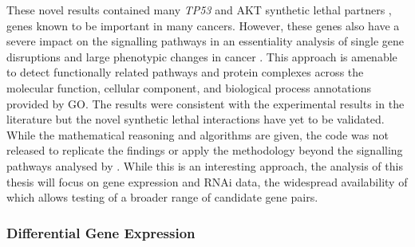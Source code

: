 These novel results contained many \textit{TP53} and AKT \gls{synthetic lethal} partners \citep{Zhang2015}, genes known to be important in many cancers. However, these genes also have a severe impact on the signalling \glspl{pathway} in an essentiality analysis of single gene disruptions and large phenotypic changes in cancer \citep{Zhang2015}. This approach is amenable to detect functionally related \glspl{pathway} and protein complexes across the molecular function, cellular component, and biological process annotations provided by \acrlong{GO}. The results were consistent with the experimental results in the literature but the novel \gls{synthetic lethal} interactions have yet to be validated. While the mathematical reasoning and algorithms are given, the code was not released to replicate the findings or apply the methodology beyond the signalling pathways analysed by \citet{Zhang2015}. While this is an interesting approach, the analysis of this thesis will focus on \gls{gene expression} and \gls{RNAi} data, the widespread availability of which allows testing of a broader range of candidate gene pairs.


\subsubsection{Differential Gene Expression}

